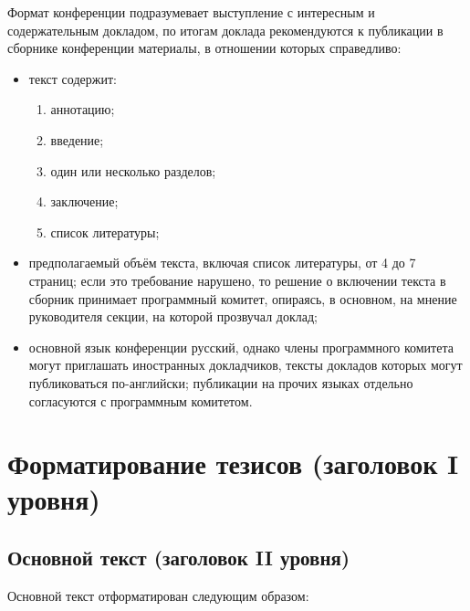 \documentclass{math-mech-sci}
\begin{document}
Формат конференции подразумевает выступление с интересным и
содержательным докладом, по итогам доклада рекомендуются к публикации
в сборнике конференции материалы, в отношении которых справедливо:

\begin{itemize}
    \item
          текст содержит:
          \begin{enumerate}
              \item
                    аннотацию;
              \item
                    введение;
              \item
                    один или несколько разделов;
              \item
                    заключение;
              \item
                    список литературы;
          \end{enumerate}
    \item
          предполагаемый объём текста, включая список литературы, от 4 до 7 страниц;
          если это требование нарушено, то решение о включении текста в
          сборник принимает программный комитет, опираясь, в основном, на
          мнение руководителя секции, на которой прозвучал доклад;
    \item
          основной язык конференции русский, однако члены программного
          комитета могут приглашать иностранных докладчиков, тексты докладов
          которых могут публиковаться по-английски; публикации на прочих языках
          отдельно согласуются с программным комитетом.
\end{itemize}

\section*{Форматирование тезисов (заголовок I уровня)}

\subsection*{Основной текст (заголовок II уровня)}

Основной текст отформатирован следующим образом:
\end{document}

